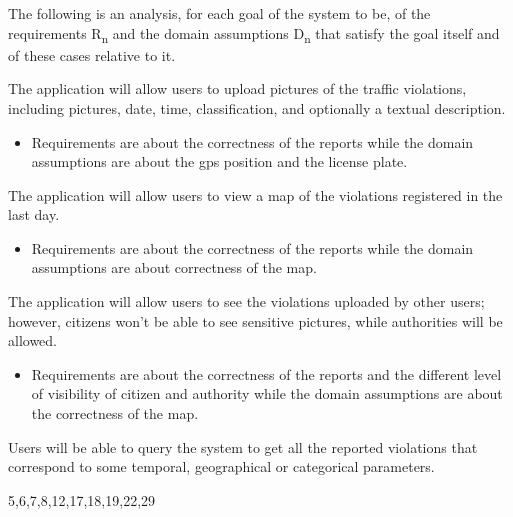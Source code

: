 \documentclass[../RASD.tex]{subfiles}
\begin{document}
                The following is an analysis, for each goal of the system to be, of the requirements R\textsubscript{n} and the domain assumptions D\textsubscript{n} that satisfy the goal itself and of these cases relative to it.
                \begin{enumerate}
                     The application will allow users to upload pictures of the traffic violations, including pictures, date, time, classification, and optionally a textual description.
                        \begin{itemize}
                            \requirement{} 1,2,3,4,5,6,9,14,15,16,17,18,19,20,21,26
                            \assumption{} 1,2,4
                            \item Requirements are about the correctness of the reports while the domain assumptions are about the gps position and the license plate.
                        \end{itemize}
                     The application will allow users to view a map of the violations registered in the last day.
                    \begin{itemize}
                        \requirement{} 1,,2,3,4,5,6,7,8,1011,12,17,18,28
                        \assumption{} 1,3
                        \item Requirements are about the correctness of the reports while the domain assumptions are about correctness of the map.
                    \end{itemize}
                     The application will allow users to see the violations uploaded by other users; however, citizens won’t be able to see sensitive pictures, while authorities will be allowed.
                    \begin{itemize}
                        \requirement{} 1,2,3,4,5,6,7,8,11,12,17,18,19,20
                        \assumption{} 2,3,4
                        \item Requirements are about the correctness of the reports and the different level of visibility of citizen and authority while the domain assumptions are about the correctness of the map.
                    \end{itemize}
                     Users will be able to query the system to get all the reported violations that correspond to some temporal, geographical or categorical parameters.
                    \begin{itemize}
                        \requirement{} 5,6,7,8,12,17,18,19,22,29

\end{itemize}
\end{enumerate}
\end{document}
